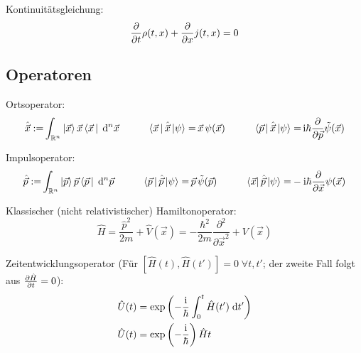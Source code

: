 			\noindent
			Kontinuitätsgleichung:
			\begin{equation}
				\frac{\partial }{\partial t}\rho(t,x) + \frac{\partial }{\partial x}j(t,x) = 0
			\end{equation}

	\subsection{Operatoren}
		\noindent
		Ortsoperator:
		\begin{equation}
			\begin{aligned}
				\hat{\vec{x}} :=& \int_{\mathbb{R}^n} \Ket{\vec{x}} \vec{x} \Bra{\vec{x}\,}\;\mathrm{d}^n\vec{x} &\hspace{20pt}
				\Bra{\vec{x}\,}\hat{\vec{x}}\Ket{\psi} =& \,\vec{x}\, \psi(\vec{x}) &\hspace{20pt}
				\Bra{\vec{p}\,}\hat{\vec{x}}\Ket{\psi} =& \,\mathrm{i}\hbar\frac{\partial }{\partial \vec{p}}\tilde{\psi}(\vec{x}) \\
			\end{aligned}
		\end{equation}

		\noindent
		Impulsoperator:
		\begin{equation}
			\begin{aligned}
				\hat{\vec{p}} :=& \int_{\mathbb{R}^n} \Ket{\vec{p}} \vec{p} \Bra{\vec{p}\,}\;\mathrm{d}^n\vec{p} &\hspace{20pt}
				\Bra{\vec{p}\,}\hat{\vec{p}}\Ket{\psi} =& \,\vec{p}\, \tilde{\psi}(\vec{p}) &\hspace{20pt}
				\Bra{\vec{x}}\hat{\vec{p}}\Ket{\psi} =& -\mathrm{i}\hbar\frac{\partial }{\partial \vec{x}} \psi(\vec{x}) \\
			\end{aligned}
		\end{equation}

		\noindent
		Klassischer (nicht relativistischer) Hamiltonoperator:
		\begin{equation}
			\hat{H} = \frac{\hat{p}^2}{2m}+\hat{V}(\vec{x}) = -\frac{\hbar^2}{2m}\frac{\partial^2}{\partial \vec{x}^2} + V(\vec{x})
		\end{equation}

		\noindent
		Zeitentwicklungsoperator (Für $\left[\hat{H}(t),\hat{H}(t')\right] = 0\;\forall t,t'$; der zweite Fall folgt aus $\frac{\partial \hat{H}}{\partial t}=0$):
		\begin{equation}
			\begin{aligned}
				\hat{U}(t) &= \exp{\left(-\frac{ \mathrm{i} }{\hbar}\int_0^t \hat{H}(t')\; \mathrm{d} t'\right)} \\
				\hat{U}(t) &= \exp{\left(-\frac{ \mathrm{i} }{\hbar}\right)\hat{H} t} \\
			\end{aligned}
		\end{equation}

